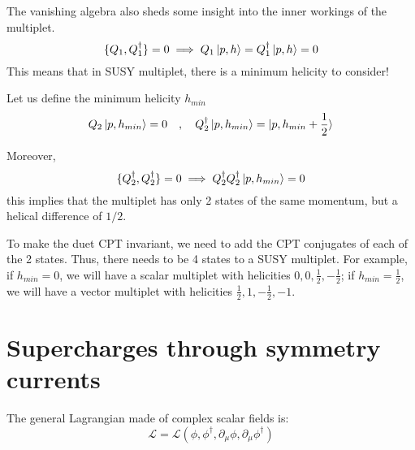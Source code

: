 The vanishing algebra also sheds some insight into the inner workings of the multiplet.
\begin{equation}
    \{Q_1, Q_1^\dagger\} = 0 \implies Q_1\ket{p,h} = Q_1^\dagger \ket{p,h} = 0
\end{equation}
This means that in SUSY multiplet, there is a minimum helicity to consider!

Let us define the minimum helicity $h_{min}$
\begin{equation}
    Q_2\ket{p, h_{min}} = 0 \quad , \quad Q_2^\dagger\ket{p, h_{min}} = \ket{p, h_{min} + \frac{1}{2}}
\end{equation}

Moreover,
\begin{equation}
    \{Q_2^\dagger, Q_2^\dagger\} = 0 \implies Q_2^\dagger Q_2^\dagger \ket{p, h_{min}} = 0
\end{equation}
this implies that the multiplet has only 2 states of the same momentum, but a helical difference of $1/2$.

To make the duet CPT invariant, we need to add the CPT conjugates of each of the 2 states. Thus, there needs to be 4 states to a SUSY multiplet. For example, if $h_{min} = 0$, we will have a scalar multiplet with helicities $0, 0, \frac{1}{2}, -\frac{1}{2}$; if $h_{min} = \frac{1}{2}$, we will have a vector multiplet with helicities $\frac{1}{2}, 1, -\frac{1}{2}, -1$.

\section{Supercharges through symmetry currents}
\label{ch:7:supercharges through symmetry currents}

The general Lagrangian made of complex scalar fields is:
\begin{equation}
    \mathcal{L} = \mathcal{L}(\phi, \phi^\dagger, \partial_\mu \phi, \partial_\mu \phi ^\dagger)
\end{equation}

